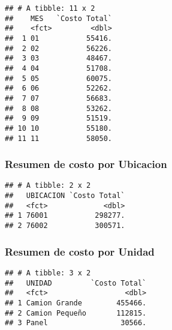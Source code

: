 \documentclass[]{article}
\newenvironment{Shaded}{\begin{snugshade}}{\end{snugshade}}
\newcommand{\KeywordTok}[1]{\textcolor[rgb]{0.13,0.29,0.53}{\textbf{#1}}}
\newcommand{\DataTypeTok}[1]{\textcolor[rgb]{0.13,0.29,0.53}{#1}}
\newcommand{\StringTok}[1]{\textcolor[rgb]{0.31,0.60,0.02}{#1}}
\newcommand{\OperatorTok}[1]{\textcolor[rgb]{0.81,0.36,0.00}{\textbf{#1}}}
\newcommand{\NormalTok}[1]{#1}
\begin{document}
\begin{verbatim}
## # A tibble: 11 x 2
##    MES   `Costo Total`
##    <fct>         <dbl>
##  1 01           55416.
##  2 02           56226.
##  3 03           48467.
##  4 04           51708.
##  5 05           60075.
##  6 06           52262.
##  7 07           56683.
##  8 08           53262.
##  9 09           51519.
## 10 10           55180.
## 11 11           58050.
\end{verbatim}

\subsubsection{Resumen de costo por
Ubicacion}\label{resumen-de-costo-por-ubicacion}

\begin{Shaded}
\end{Shaded}

\begin{verbatim}
## # A tibble: 2 x 2
##   UBICACION `Costo Total`
##   <fct>             <dbl>
## 1 76001           298277.
## 2 76002           300571.
\end{verbatim}

\subsubsection{Resumen de costo por
Unidad}\label{resumen-de-costo-por-unidad}

\begin{Shaded}
\end{Shaded}

\begin{verbatim}
## # A tibble: 3 x 2
##   UNIDAD         `Costo Total`
##   <fct>                  <dbl>
## 1 Camion Grande        455466.
## 2 Camion Pequeño       112815.
## 3 Panel                 30566.
\end{verbatim}
\end{document}
